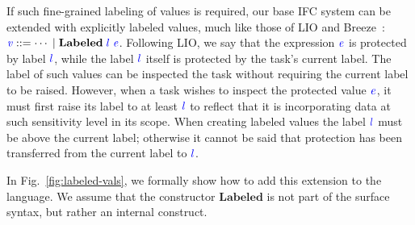 \documentclass{llncs}
\newcommand{\Varid}[1]{\mathit{#1}}
\begin{document}
If such fine-grained labeling of values is required, our base IFC
system can be extended with explicitly labeled
values, much like those of LIO and
Breeze~\cite{lio, Hritcu:2013:YIB:2497621.2498098}: \ensuremath{\ifc{\Varid{v}}\Coloneqq\cdots\;|\;\mathbf{Labeled}\;\ifc{l}\;\ifc{\Varid{e}}}.
Following LIO, we say that the expression \ensuremath{\ifc{\Varid{e}}} is protected by label \ensuremath{\ifc{l}},
while the label \ensuremath{\ifc{l}} itself is protected by the task's current label.
The label of such values can be inspected the task without
requiring the current label to be raised.
However, when a task wishes to inspect the protected value \ensuremath{\ifc{\Varid{e}}}, it
must first raise its label to at least \ensuremath{\ifc{l}} to reflect that it is
incorporating data at such sensitivity level in its scope.
When creating labeled values the label \ensuremath{\ifc{l}} must be above
the current label; otherwise it cannot be said that protection has
been transferred from the current label to \ensuremath{\ifc{l}}.


In Fig.~\ref{fig:labeled-vals}, we formally show how to add this
extension to the language.
We assume that the constructor \ensuremath{\mathbf{Labeled}} is not part
of the surface syntax, but rather an internal construct.
\end{document}
